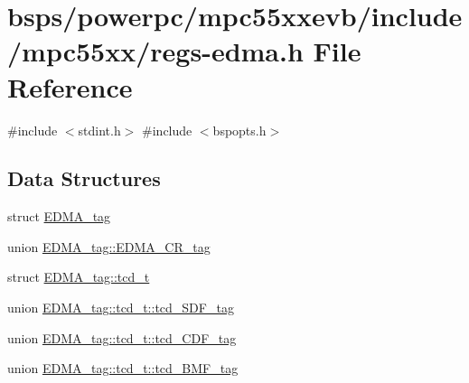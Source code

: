 \hypertarget{regs-edma_8h}{}\section{bsps/powerpc/mpc55xxevb/include/mpc55xx/regs-\/edma.h File Reference}
\label{regs-edma_8h}
{\ttfamily \#include $<$stdint.\+h$>$}\newline
{\ttfamily \#include $<$bspopts.\+h$>$}\newline
\subsection*{Data Structures}
\begin{DoxyCompactItemize}
\item 
struct \mbox{\hyperlink{structEDMA__tag}{E\+D\+M\+A\+\_\+tag}}
\item 
union \mbox{\hyperlink{unionEDMA__tag_1_1EDMA__CR__tag}{E\+D\+M\+A\+\_\+tag\+::\+E\+D\+M\+A\+\_\+\+C\+R\+\_\+tag}}
\item 
struct \mbox{\hyperlink{structEDMA__tag_1_1tcd__t}{E\+D\+M\+A\+\_\+tag\+::tcd\+\_\+t}}
\item 
union \mbox{\hyperlink{unionEDMA__tag_1_1tcd__t_1_1tcd__SDF__tag}{E\+D\+M\+A\+\_\+tag\+::tcd\+\_\+t\+::tcd\+\_\+\+S\+D\+F\+\_\+tag}}
\item 
union \mbox{\hyperlink{unionEDMA__tag_1_1tcd__t_1_1tcd__CDF__tag}{E\+D\+M\+A\+\_\+tag\+::tcd\+\_\+t\+::tcd\+\_\+\+C\+D\+F\+\_\+tag}}
\item 
union \mbox{\hyperlink{unionEDMA__tag_1_1tcd__t_1_1tcd__BMF__tag}{E\+D\+M\+A\+\_\+tag\+::tcd\+\_\+t\+::tcd\+\_\+\+B\+M\+F\+\_\+tag}}
\end{DoxyCompactItemize}
